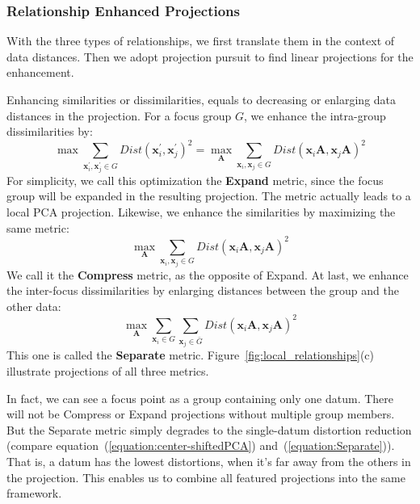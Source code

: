 \subsubsection{Relationship Enhanced Projections}
\label{subsubsection:relationship_enhancement}
With the three types of relationships, we first translate them in the context of data distances. Then we adopt projection pursuit to find linear projections for the enhancement.

Enhancing similarities or dissimilarities, equals to decreasing or enlarging data distances in the projection. For a focus group $G$, we enhance the intra-group dissimilarities by:
\begin{equation}
\max \sum\limits_{\mathbf{x}_{i}^{\prime}, \mathbf{x}_{j}^{\prime} \in G} Dist(\mathbf{x}_{i}^{\prime}, \mathbf{x}_{j}^{\prime})^{2} = \max_{\mathbf{A}} \sum\limits_{\mathbf{x}_{i}, \mathbf{x}_{j} \in G} Dist(\mathbf{x}_{i}\mathbf{A}, \mathbf{x}_{j}\mathbf{A})^{2}
\end{equation}
For simplicity, we call this optimization the \textbf{Expand} metric, since the focus group will be expanded in the resulting projection. The metric actually leads to a local PCA projection. Likewise, we enhance the similarities by maximizing the same metric:
\begin{equation}
\max_{\mathbf{A}} \sum\limits_{\mathbf{x}_{i}, \mathbf{x}_{j} \in G} Dist(\mathbf{x}_{i}\mathbf{A}, \mathbf{x}_{j}\mathbf{A})^{2}
\end{equation}
We call it the \textbf{Compress} metric, as the opposite of Expand. At last, we enhance the inter-focus dissimilarities by enlarging distances between the group and the other data:
\begin{equation}
\label{equation:Separate}
\max_{\mathbf{A}} \sum\limits_{\mathbf{x}_{i} \in G} \sum\limits_{\mathbf{x}_{j} \in \bar{G}} Dist(\mathbf{x}_{i}\mathbf{A}, \mathbf{x}_{j}\mathbf{A})^{2}
\end{equation}
This one is called the \textbf{Separate} metric. Figure~\ref{fig:local_relationships}(c) illustrate projections of all three metrics.

In fact, we can see a focus point as a group containing only one datum. There will not be Compress or Expand projections without multiple group members. But the Separate metric simply degrades to the single-datum distortion reduction (compare equation~(\ref{equation:center-shiftedPCA}) and~(\ref{equation:Separate})). That is, a datum has the lowest distortions, when it's far away from the others in the projection. This enables us to combine all featured projections into the same framework.

